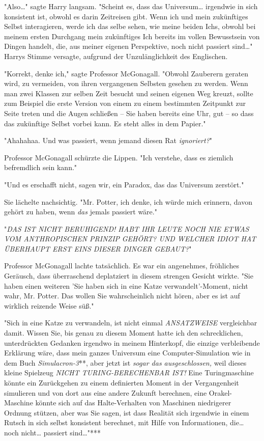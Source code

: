 {"Also…" sagte Harry langsam. "Scheint es, dass das Universum… irgendwie in sich konsistent ist, obwohl es darin Zeitreisen gibt. Wenn ich und mein zukünftiges Selbst interagieren, werde ich das selbe sehen, wie meine beiden Ichs, obwohl bei meinem ersten Durchgang mein zukünftiges Ich bereits im vollen Bewusstsein von Dingen handelt, die, aus meiner eigenen Perspektive, noch nicht passiert sind…" Harrys Stimme versagte, aufgrund der Unzulänglichkeit des Englischen.

"Korrekt, denke ich," sagte Professor McGonagall. "Obwohl Zauberern geraten wird, zu vermeiden, von ihren vergangenen Selbsten gesehen zu werden. Wenn man zwei Klassen zur selben Zeit besucht und seinen eigenen Weg kreuzt, sollte zum Beispiel die erste Version von einem zu einem bestimmten Zeitpunkt zur Seite treten und die Augen schließen -- Sie haben bereits eine Uhr, gut -- so dass das zukünftige Selbst vorbei kann. Es steht alles in dem Papier."

"Ahahahaa. Und was passiert, wenn jemand diesen Rat \emph{ignoriert?}"

Professor McGonagall schürzte die Lippen. "Ich verstehe, dass es ziemlich befremdlich sein kann."

"Und es erschafft nicht, sagen wir, ein Paradox, das das Universum zerstört."

Sie lächelte nachsichtig. "Mr. Potter, ich denke, ich würde mich erinnern, davon gehört zu haben, wenn \emph{das} jemals passiert wäre."

"\emph{DAS IST NICHT BERUHIGEND! HABT IHR LEUTE NOCH NIE ETWAS VOM ANTHROPISCHEN PRINZIP} \emph{GEHÖRT? UND WELCHER IDIOT HAT ÜBERHAUPT ERST EINS DIESER DINGER GEBAUT?}"

Professor McGonagall lachte tatsächlich. Es war ein angenehmes, fröhliches Geräusch, dass überraschend deplatziert in diesem strengen Gesicht wirkte. "Sie haben einen weiteren 'Sie haben sich in eine Katze verwandelt'-Moment, nicht wahr, Mr. Potter. Das wollen Sie wahrscheinlich nicht hören, aber es ist auf wirklich reizende Weise süß."

"Sich in eine Katze zu verwandeln, ist nicht einmal \emph{ANSATZWEISE} vergleichbar damit. Wissen Sie, bis genau zu diesem Moment hatte ich den schrecklichen, unterdrückten Gedanken irgendwo in meinem Hinterkopf, die einzige verbleibende Erklärung wäre, dass mein ganzes Universum eine Computer-Simulation wie in dem Buch \emph{Simulacron-3}**, aber jetzt ist \emph{sogar das ausgeschlossen,} weil dieses kleine Spielzeug \emph{NICHT TURING-BERECHENBAR IST!} Eine Turingmaschine könnte ein Zurückgehen zu einem definierten Moment in der Vergangenheit simulieren und von dort aus eine andere Zukunft berechnen, eine Orakel-Maschine könnte sich auf das Halte-Verhalten von Maschinen niedrigerer Ordnung stützen, aber was Sie sagen, ist dass Realität sich irgendwie in einem Rutsch in sich selbst konsistent berechnet, mit Hilfe von Informationen, die… noch nicht… passiert sind…"***

}
